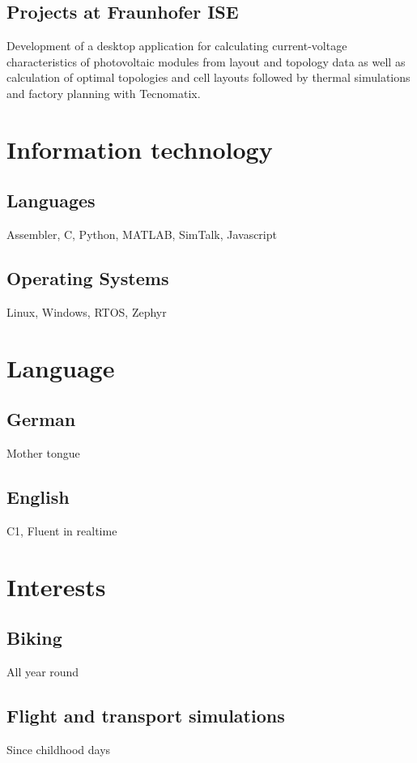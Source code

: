 \documentclass[10pt, a4paper, sans]{moderncv}
\begin{document}
\subsection{Projects at Fraunhofer ISE}
Development of a desktop application for calculating current-voltage characteristics of photovoltaic modules from layout and topology data as well as calculation of optimal topologies and cell layouts
followed by thermal simulations and factory planning with Tecnomatix.

\section{Information technology}
\subsection*{Languages}
Assembler, C, Python, MATLAB, SimTalk, Javascript
\subsection*{Operating Systems}
Linux, Windows, RTOS, Zephyr

\section{Language}
\subsection{German}
Mother tongue
\subsection{English}
C1, Fluent in realtime

\section{Interests}
\subsection*{Biking}
All year round
\subsection*{Flight and transport simulations}
Since childhood days
\end{document}
